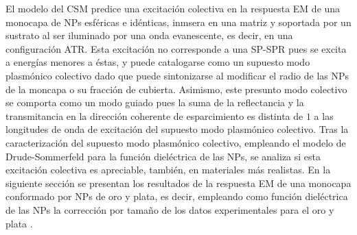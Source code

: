 El modelo del CSM predice una excitación colectiva en la respuesta EM de una monocapa de NPs esféricas e idénticas, inmsera en una matriz y soportada por un sustrato al ser iluminado por una onda evanescente, es decir, en una configuración ATR. Esta excitación no corresponde a una SP-SPR pues se excita a energías menores a éstas, y puede catalogarse como un supuesto modo plasmónico colectivo dado que puede sintonizarse al modificar el radio de las NPs de la moncapa o su fracción de cubierta. Asimismo, este presunto modo colectivo se comporta como un modo guiado pues la suma de la reflectancia y la transmitancia en la dirección coherente de esparcimiento es distinta de $1$ a las longitudes de onda de excitación del supuesto modo plasmónico colectivo. Tras la caracterización del supuesto modo plasmónico colectivo, empleando el modelo de Drude-Sommerfeld para la función dieléctrica de las NPs, se analiza si esta excitación colectiva es apreciable, también, en materiales más realistas. En la siguiente sección se presentan los resultados de la respuesta EM de una monocapa conformado por NPs de oro y plata, es decir, empleando como función dieléctrica de las NPs la corrección por tamaño de los datos experimentales para el oro y plata \cite{johnson1972constants}.


